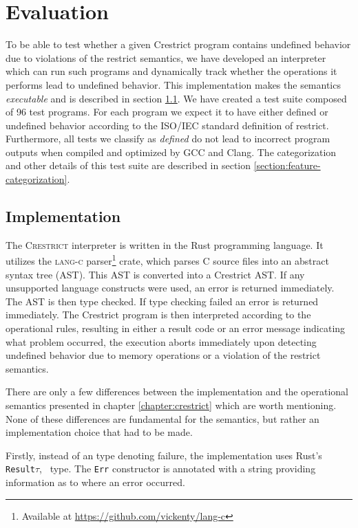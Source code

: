 \chapter{Evaluation}\label{chapt:evaluation}
To be able to test whether a given Crestrict program contains undefined behavior due to 
violations of the restrict semantics, we have developed an interpreter which can run
such programs and dynamically track whether the operations it performs lead to undefined behavior.
This implementation makes the semantics \textit{executable} and is described in section \ref{section:implementation}. 
We have created a test suite composed of 96 test programs.
For each program we expect it to have either defined or undefined behavior according to the ISO/IEC standard definition of restrict.
Furthermore, all tests we classify as \textit{defined} do not lead to incorrect program outputs
when compiled and optimized by GCC and Clang.
The categorization and other details of this test suite are described in section \ref{section:feature-categorization}.

\section{Implementation}\label{section:implementation}
The \textsc{Crestrict} interpreter is written in the Rust programming language.
It utilizes the \textsc{lang-c} parser\footnote{Available at \url{https://github.com/vickenty/lang-c}} crate,
which parses C source files into an abstract syntax tree (AST).
This AST is converted into a Crestrict AST.
If any unsupported language constructs were used, an error is returned immediately.
The AST is then type checked.
If type checking failed an error is returned immediately.
The Crestrict program is then interpreted according to the operational rules,
resulting in either a result code or an error message indicating what problem occurred, \ie 
the execution aborts immediately upon detecting undefined behavior
due to memory operations or a violation of the restrict semantics. 

There are only a few differences between the implementation and the operational semantics presented in chapter
\ref{chapter:crestrict} which are worth mentioning.
None of these differences are fundamental for the semantics, but rather an implementation choice that had to be made.

Firstly, instead of an \textdom{$\Optiontype{\tau}$} type denoting failure, the implementation uses 
Rust's \quad \texttt{Result}\textlangle$\tau$, \textrangle \ type. 
The \texttt{Err} constructor is annotated with a string providing information as to where an error occurred.

